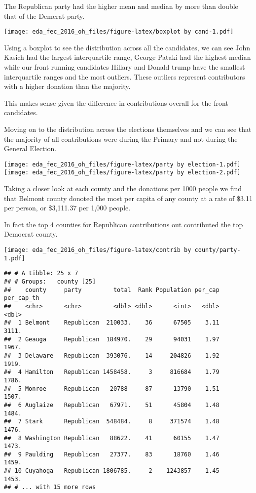 \documentclass[]{article}
\begin{document}
The Republican party had the higher mean and median by more than double
that of the Demcrat party.

\texttt{[image: eda\_fec\_2016\_oh\_files/figure-latex/boxplot by cand-1.pdf]}

Using a boxplot to see the distribution across all the candidates, we
can see John Kasich had the largest interquartile range, George Pataki
had the highest median while our front running candidates Hillary and
Donald trump have the smallest interquartile ranges and the most
outliers. These outliers represent contributors with a higher donation
than the majority.

This makes sense given the difference in contributions overall for the
front candidates.

Moving on to the distribution across the elections themselves and we can
see that the majority of all contributions were during the Primary and
not during the General Election.

\texttt{[image: eda\_fec\_2016\_oh\_files/figure-latex/party by election-1.pdf]}
\texttt{[image: eda\_fec\_2016\_oh\_files/figure-latex/party by election-2.pdf]}

Taking a closer look at each county and the donations per 1000 people we
find that Belmont county donoted the most per capita of any county at a
rate of \$3.11 per person, or \$3,111.37 per 1,000 people.

In fact the top 4 counties for Republican contributions out contributed
the top Democrat county.

\texttt{[image: eda\_fec\_2016\_oh\_files/figure-latex/contrib by county/party-1.pdf]}

\begin{verbatim}
## # A tibble: 25 x 7
## # Groups:   county [25]
##    county     party         total  Rank Population per_cap per_cap_th
##    <chr>      <chr>         <dbl> <dbl>      <int>   <dbl>      <dbl>
##  1 Belmont    Republican  210033.    36      67505    3.11      3111.
##  2 Geauga     Republican  184970.    29      94031    1.97      1967.
##  3 Delaware   Republican  393076.    14     204826    1.92      1919.
##  4 Hamilton   Republican 1458458.     3     816684    1.79      1786.
##  5 Monroe     Republican   20788     87      13790    1.51      1507.
##  6 Auglaize   Republican   67971.    51      45804    1.48      1484.
##  7 Stark      Republican  548484.     8     371574    1.48      1476.
##  8 Washington Republican   88622.    41      60155    1.47      1473.
##  9 Paulding   Republican   27377.    83      18760    1.46      1459.
## 10 Cuyahoga   Republican 1806785.     2    1243857    1.45      1453.
## # ... with 15 more rows
\end{verbatim}
\end{document}
